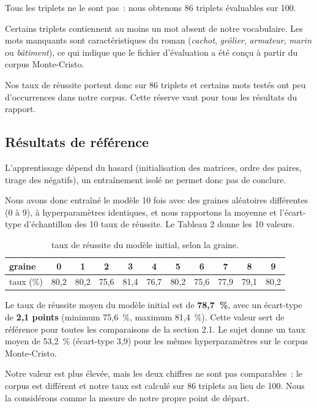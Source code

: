 \documentclass[11pt,a4paper]{article}
\begin{document}
Tous les triplets ne le sont pas~: nous obtenons 86 triplets évaluables sur 100.

Certains triplets contiennent au moins un mot absent de notre vocabulaire. Les mots manquants sont caractéristiques du roman (\emph{cachot}, \emph{geôlier}, \emph{armateur}, \emph{marin} ou \emph{bâtiment}), ce qui indique que le fichier d’évaluation a été conçu à partir du corpus Monte-Cristo.

Nos taux de réussite portent donc sur 86 triplets et certains mots testés ont peu d’occurrences dans notre corpus. Cette réserve vaut pour tous les résultats du rapport.

\subsection*{Résultats de référence}

L’apprentissage dépend du hasard (initialisation des matrices, ordre des paires, tirage des négatifs), un entraînement isolé ne permet donc pas de conclure.

Nous avons donc entraîné le modèle 10 fois avec des graines aléatoires différentes (0 à 9), à hyperparamètres identiques, et nous rapportons la moyenne et l’écart-type d’échantillon des 10 taux de réussite. Le Tableau 2 donne les 10 valeurs.

\begin{table}[!htbp]
\centering
\small
\caption{taux de réussite du modèle initial, selon la graine.}
\begin{tabular}{lcccccccccc}
\toprule
\textbf{graine} & \textbf{0} & \textbf{1} & \textbf{2} & \textbf{3} & \textbf{4} & \textbf{5} & \textbf{6} & \textbf{7} & \textbf{8} & \textbf{9} \\
\midrule
taux (\%) & 80,2 & 80,2 & 75,6 & 81,4 & 76,7 & 80,2 & 75,6 & 77,9 & 79,1 & 80,2 \\
\bottomrule
\end{tabular}
\end{table}

Le taux de réussite moyen du modèle initial est de \textbf{78,7~\%}, avec un écart-type de \textbf{2,1 points} (minimum 75,6~\%, maximum 81,4~\%). Cette valeur sert de référence pour toutes les comparaisons de la section 2.1. Le sujet donne un taux moyen de 53,2~\% (écart-type 3,9) pour les mêmes hyperparamètres sur le corpus Monte-Cristo.

Notre valeur est plus élevée, mais les deux chiffres ne sont pas comparables~: le corpus est différent et notre taux est calculé sur 86 triplets au lieu de 100. Nous la considérons comme la mesure de notre propre point de départ.
\end{document}
